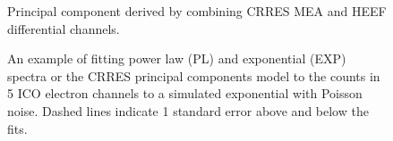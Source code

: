 \documentclass{article}    %
\begin{document}
\begin{figure}
\caption{Principal component derived by combining CRRES MEA and HEEF differential channels.}
\label{figPC_Model}
\end{figure}

\begin{figure}
\caption{An example of fitting power law (PL) and exponential (EXP) spectra
	or the CRRES principal components model to the counts in 5 ICO
	electron channels to a simulated exponential with Poisson
	noise. Dashed lines indicate 1 standard error above and below
	the fits.}
\label{figSpec_Inv_example}
\end{figure}
\end{document}
